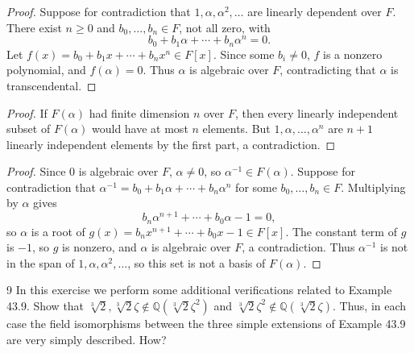 \begin{proof}
    Suppose for contradiction that $1, \alpha, \alpha^2, \ldots$ are linearly
    dependent over $F$. 
    There exist $n \ge 0$ and $b_0, \ldots, b_n \in F$, not all zero, with
    \[
        b_0 + b_1 \alpha + \cdots + b_n \alpha^n = 0.
    \]
    Let $f(x) = b_0 + b_1 x + \cdots + b_n x^n \in F[x]$. Since some $b_i \ne 0$,
    $f$ is a nonzero polynomial, and $f(\alpha) = 0$. Thus
    $\alpha$ is algebraic over $F$, contradicting that $\alpha$ is transcendental.
\end{proof}

\begin{proof}
    If $F(\alpha)$ had finite dimension $n$ over $F$, then every linearly
    independent subset of $F(\alpha)$ would have at most $n$ elements. But
    $1, \alpha, \ldots, \alpha^n$ are $n + 1$ linearly independent elements
    by the first part, a contradiction.
\end{proof}

\begin{proof}
    Since $0$ is algebraic over $F$, $\alpha \ne 0$, so $\alpha^{-1} \in F(\alpha)$.
    Suppose for contradiction that $\alpha^{-1} = b_0 + b_1 \alpha + \cdots + b_n \alpha^n$
    for some $b_0, \ldots, b_n \in F$. Multiplying by $\alpha$ gives
    \[
        b_n \alpha^{n+1} + \cdots + b_0 \alpha - 1 = 0,
    \]
    so $\alpha$ is a root of $g(x) = b_n x^{n+1} + \cdots + b_0 x - 1 \in F[x]$.
    The constant term of $g$ is $-1$, so $g$ is nonzero, and $\alpha$ is algebraic
    over $F$, a contradiction. Thus $\alpha^{-1}$ is not in the span of
    $1, \alpha, \alpha^2, \ldots$, so this set is not a basis of $F(\alpha)$.
\end{proof}
\begin{problem}{9}
    In this exercise we perform some additional verifications related to Example 43.9.
    Show that $\sqrt[3]{2}, \sqrt[3]{2}\zeta \notin \mathbb{Q}(\sqrt[3]{2}\zeta^2)$ and
    $\sqrt[3]{2}\zeta^2 \notin \mathbb{Q}(\sqrt[3]{2}\zeta)$. Thus, in each case the field
    isomorphisms between the three simple extensions of Example 43.9 are very simply
    described. How?
\end{problem}
\unsolved
